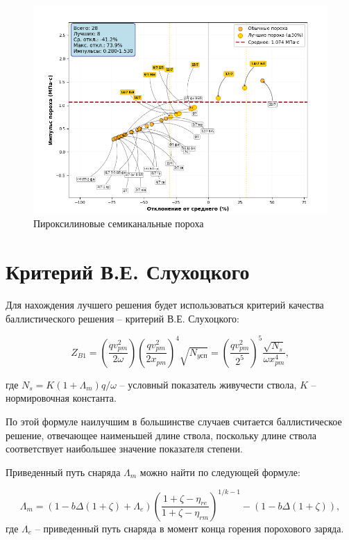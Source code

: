 \documentclass[14pt, a4paper]{extreport} %
\begin{document}
\begin{figure}[H]
\centering
\includegraphics[width=0.6\textheight]{imgs/kaif4.png}
\caption{Пироксилиновые семиканальные пороха}
\end{figure}

\section{Критерий В.Е. Слухоцкого}
Для нахождения лучшего решения будет использоваться критерий качества баллистического решения -- критерий В.Е. Слухоцкого:

\begin{equation}
Z_{B1} = \left( \frac{qv_{pm}^2}{2\omega} \right) \left( \frac{qv_{pm}^2}{2x_{pm}} \right)^4 \sqrt{N_{y\text{сп}}} = \left( \frac{qv_{pm}^2}{2^5} \right)^5 \frac{\sqrt{N_s}}{\omega x_{pm}^4},
\end{equation}


где \( N_s = K(1 + \Lambda_m) q / \omega \) -- условный показатель живучести ствола,  
\( K \) -- нормировочная константа. 

По этой формуле наилучшим в большинстве случаев считается  
баллистическое решение, отвечающее наименьшей длине ствола, поскольку  
длине ствола соответствует наибольшее значение показателя степени.

Приведенный путь снаряда \(\Lambda_m\) можно найти по следующей формуле: 

\begin{equation}
\Lambda_m = \left( 1 - b\Delta \left( 1 + \zeta \right) + \Lambda_e \right) \left( \frac{1 + \zeta - \eta_{re}}{1 + \zeta - \eta_{rm}} \right)^{1/k-1} - \left( 1 - b\Delta \left( 1 + \zeta \right) \right),
\end{equation}
где \( \Lambda_e \) -- приведенный путь снаряда в момент конца горения порохового заряда.
\end{document}
